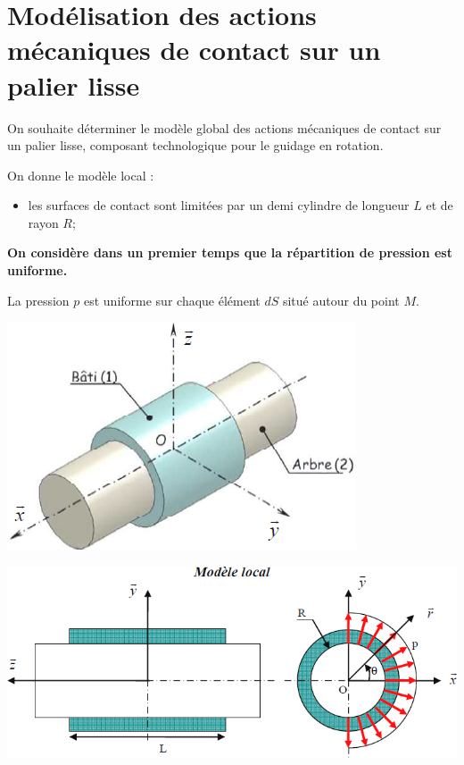 \documentclass[11pt,oneside]{article}
\begin{document}
\section*{Modélisation des actions mécaniques de contact sur un palier lisse}
\begin{minipage}[c]{.55\linewidth}

On souhaite déterminer le modèle global des actions mécaniques de contact sur un palier lisse, composant technologique pour le guidage en rotation.

On donne le modèle local :
\begin{itemize}
\item les surfaces de contact sont limitées par un demi cylindre de longueur $L$ et de rayon $R$;
\end{itemize}

\textbf{On considère dans un premier temps que la répartition de pression est uniforme.}

La pression $p$ est uniforme sur chaque élément $dS$ situé autour du point $M$.

\end{minipage}\hfill
\begin{minipage}[c]{.4\linewidth}
\begin{center}
\includegraphics[width=.9\textwidth]{png/fig5}
\end{center}
\end{minipage}

\vspace{.25cm}
\begin{center}
\includegraphics[width=.75\textwidth]{png/fig6}
\end{center}
\end{document}
